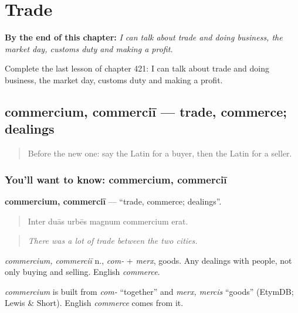 
\chapter{Trade}
\label{ch:la-trade}

\begin{chapteropening}
\textbf{By the end of this chapter:} \emph{I can talk about trade and doing business, the market day, customs duty and making a profit.}

Complete the last lesson of chapter 421: I can talk about trade and doing business, the market day, customs duty and making a profit.
\end{chapteropening}

\section[commercium, commerciī]{commercium, commerciī — trade, commerce; dealings}

\label{lesson:LA-C421-commercium}



\begin{quote}
Before the new one: say the Latin for a buyer, then the Latin for a seller.
\end{quote}

\subsection*{You'll want to know: commercium, commerciī}
\textbf{commercium, commerciī} — \textquotedblleft{}trade, commerce; dealings\textquotedblright{}.

\begin{quote}
Inter duās urbēs magnum commercium erat.
\end{quote}

\begin{quote}
\emph{There was a lot of trade between the two cities.}
\end{quote}

\emph{commercium, commerciī} n., \emph{com-} + \emph{merx}, goods. Any dealings with people, not only buying and selling. English \emph{commerce}.

\begin{cousinweb}
\emph{commercium} is built from \emph{com-} \textquotedblleft{}together\textquotedblright{} and \emph{merx, mercis} \textquotedblleft{}goods\textquotedblright{} (EtymDB; Lewis \& Short). English \emph{commerce} comes from it.
\end{cousinweb}

